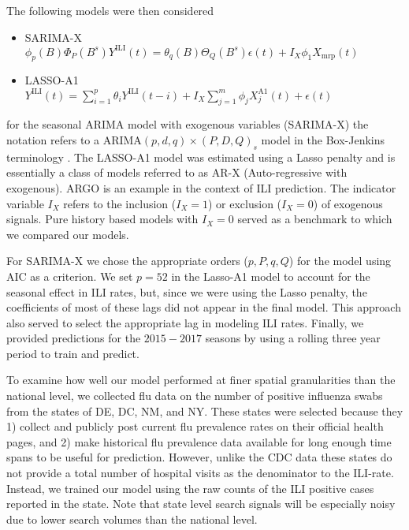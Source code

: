 \documentclass[fleqn,10pt]{wlscirep}
\begin{document}
The following models were then considered
\begin{itemize}
\item SARIMA-X \\
$\phi_p(B)\Phi_P(B^s)Y^{\text{ILI}}(t) =  \theta_q(B)\Theta_Q(B^s)\epsilon(t) + I_X\phi_1 X_{\text{mrp}}(t)$
\item LASSO-A1 \\
$Y^{\text{ILI}}(t) = \sum_{i=1}^p \theta_i Y^{\text{ILI}}(t-i) +  I_X\sum_{j=1}^m \phi_j X_j^{\text{A1}}(t) + \epsilon(t)$
\end{itemize}
for the seasonal ARIMA model with exogenous variables (SARIMA-X) the notation refers to a ARIMA$(p,d,q)\times(P,D,Q)_s$ model in the Box-Jenkins terminology \cite{box_etal_2015}. The LASSO-A1 model was estimated using a Lasso penalty and is essentially a class of models referred to as AR-X (Auto-regressive with exogenous). ARGO \cite{yang_etal_2015inference, yang_etal_2015} is an example in the context of ILI prediction. The indicator variable $I_X$ refers to the inclusion ($I_X=1$) or exclusion ($I_X=0$) of exogenous signals. Pure history based models with $I_X=0$ served as a benchmark to which we compared our models. 

For SARIMA-X we chose the appropriate orders ($p,P,q,Q$) for the model using AIC as a criterion. We set $p=52$ in the Lasso-A1 model to account for the seasonal effect in ILI rates, but, since we were using the Lasso penalty, the coefficients of most of these lags did not appear in the final model. This approach also served to select the appropriate lag in modeling ILI rates. Finally, we provided predictions for the $2015-2017$ seasons by using a rolling three year period to train and predict.

To examine how well our model performed at finer spatial granularities than the national level, we collected flu data on the number of positive influenza swabs from the states of DE, DC, NM, and NY. These states were selected because they 1) collect and publicly post current flu prevalence rates on their official health pages, and 2) make historical flu prevalence data available for long enough time spans to be useful for prediction. However, unlike the CDC data these states do not provide a total number of hospital visits as the denominator to the ILI-rate. Instead, we trained our model using the raw counts of the ILI positive cases reported in the state. 
Note that state level search signals will be especially noisy due to lower search volumes than the national level. 
\end{document}
